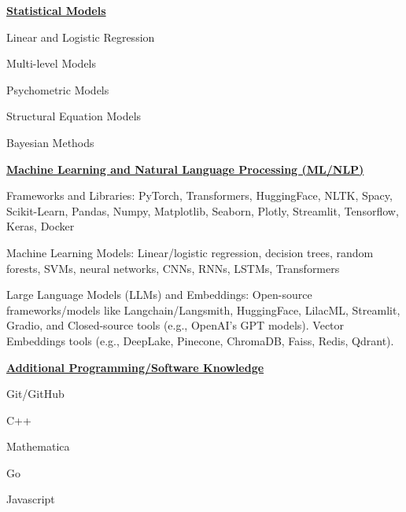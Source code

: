 \documentclass[margin,line]{res}
\newenvironment{list1}{
  \begin{list}{\ding{113}}{%
      \setlength{\itemsep}{0in}
      \setlength{\parsep}{0in} \setlength{\parskip}{0in}
      \setlength{\topsep}{0in} \setlength{\partopsep}{0in}
      \setlength{\leftmargin}{0.17in}}}{\end{list}}
\renewcommand{\subsection}[1]{%
      \par\vspace{3pt}%
      \underline{\normalsize\bfseries #1}%
      \par\vspace{3pt}%
    }
\begin{document}
\begin{resume}
  \subsection{\sc Statistical Models}
  \begin{list1}
  \item Linear and Logistic Regression
  \item Multi-level Models
  \item Psychometric Models
  \item Structural Equation Models
  \item Bayesian Methods
  \end{list1}
  
  \subsection{\sc Machine Learning and Natural Language Processing (ML/NLP)}
  \begin{list1}
  \item Frameworks and Libraries: PyTorch, Transformers, HuggingFace, NLTK, Spacy, Scikit-Learn, Pandas, Numpy, Matplotlib, Seaborn, Plotly, Streamlit, Tensorflow, Keras, Docker
  \item Machine Learning Models: Linear/logistic regression, decision trees, random forests, SVMs, neural networks, CNNs, RNNs, LSTMs, Transformers
  \item Large Language Models (LLMs) and Embeddings: Open-source frameworks/models like Langchain/Langsmith, HuggingFace, LilacML, Streamlit, Gradio, and Closed-source tools (e.g., OpenAI's GPT models). Vector Embeddings tools (e.g., DeepLake, Pinecone, ChromaDB, Faiss, Redis, Qdrant).
  \end{list1}
  
  \subsection{\sc Additional Programming/Software Knowledge}
  \begin{list1}
    \item Git/GitHub
    \item C++
    \item Mathematica
    \item Go
    \item Javascript
    \end{list1}
  \end{resume} 
  
\end{document}

